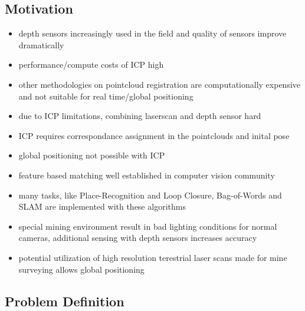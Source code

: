 \subsection{Motivation}

\begin{itemize}
    \item depth sensors increasingly used in the field and quality of sensors improve dramatically
    \item performance/compute costs of ICP high
    \item other methodologies on pointcloud registration are computationally expensive and not suitable for real time/global positioning
    \item due to ICP limitations, combining laserscan and depth sensor hard
    \item ICP requires correspondance assignment in the pointclouds and inital pose
    \item global positioning not possible with ICP
    \item feature based matching well established in computer vision community
    \item many tasks, like Place-Recognition and Loop Closure, Bag-of-Words and SLAM are implemented with these algorithms
    \item special mining environment result in bad lighting conditions for normal cameras, additional sensing with depth sensors increases accuracy
    \item potential utilization of high resolution terestrial laser scans made for mine surveying allows global positioning
\end{itemize}

\subsection{Problem Definition}

